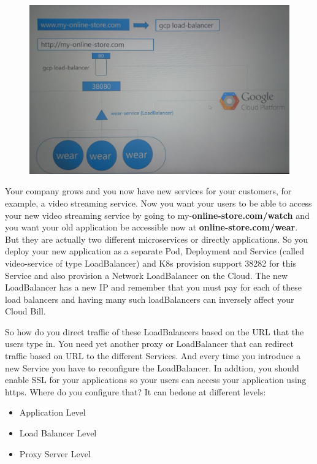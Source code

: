 \documentclass{article}
\begin{document}
\begin{figure}[H]
    \centering
    \includegraphics[width=\textwidth]{pictures/ingress6.png}
\end{figure}

Your company grows and you now have new services for your customers, for example, a video streaming service. Now you want your users to be able to access your new video streaming service by going to my-\textbf{online-store.com/watch} and you want your old application be accessible now at \textbf{online-store.com/wear}. But they are actually two different microservices or directly applications. So you deploy your new application as a separate Pod, Deployment and Service (called video-service of type LoadBalancer) and K8s provision support 38282 for this Service and also provision a Network LoadBalancer on the Cloud. The new LoadBalancer has a new IP and remember that you must pay for each of these load balancers and having many such loadBalancers can inversely affect your Cloud Bill. 

So how do you direct traffic of these LoadBalancers based on the URL that the users type in. You need yet another proxy or LoadBalancer that can redirect traffic based on URL to the different Services. And every time you introduce a new Service you have to reconfigure the LoadBalancer. In addtion, you should enable SSL for your applications so your users can access your application using https. Where do you configure that? It can bedone at different levels: 

\begin{itemize}
    \item Application Level
    \item Load Balancer Level
    \item Proxy Server Level
\end{itemize}
\end{document}
